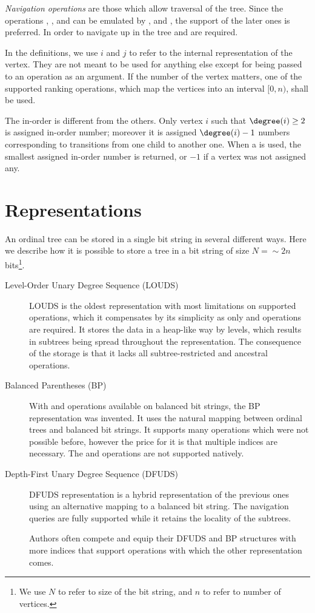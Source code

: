 \emph{Navigation operations} are those which allow traversal of the tree.
Since the operations \childPrev{}, \childNext{}, \childFirst{} and \childLast{} can be emulated by \childRank{}, \childSelect{} and \degree{}, the support of the later ones is preferred.
In order to navigate up in the tree \parent{} and \isRoot{} are required.

In the definitions, we use $i$ and $j$ to refer to the internal representation of the vertex.
They are not meant to be used for anything else except for being passed to an operation as an argument.
If the number of the vertex matters, one of the supported ranking operations, which map the vertices into an interval $[0, n)$, shall be used.

The in-order \rank{} is different from the others.
Only vertex $i$ such that $\degree(i) \ge 2$ is assigned in-order number; moreover it is assigned $\degree(i) - 1$ numbers corresponding to transitions from one child to another one.
When a \inRank{} is used, the smallest assigned in-order number is returned, or $-1$ if a vertex was not assigned any.

\section{Representations}

An ordinal tree can be stored in a single bit string in several different ways.
Here we describe how it is possible to store a tree in a bit string of size $N = \sim 2n$ bits\footnote{
	We use $N$ to refer to size of the bit string, and $n$ to refer to number of vertices.
}.
\begin{description}
	\item[Level-Order Unary Degree Sequence (LOUDS)]
	LOUDS is the oldest representation with most limitations on supported operations, which it compensates by its simplicity as only \rank{} and \select{} operations are required.
	It stores the data in a heap-like way by levels, which results in subtrees being spread throughout the representation.
	The consequence of the storage is that it lacks all subtree-restricted and ancestral operations.
	
	\item[Balanced Parentheses (BP)]
	With \match{} and \enclose{} operations available on balanced bit strings, the BP representation was invented.
	It uses the natural mapping between ordinal trees and balanced bit strings.
	It supports many operations which were not possible before, however the price for it is that multiple indices are necessary.
	The \childRank{} and \childSelect{} operations are not supported natively.
	
	\item[Depth-First Unary Degree Sequence (DFUDS)]
	DFUDS representation is a hybrid representation of the previous ones using an alternative mapping to a balanced bit string.
	The navigation queries are fully supported while it retains the locality of the subtrees.
	
	Authors often compete and equip their DFUDS and BP structures with more indices that support operations with which the other representation comes.
\end{description}

